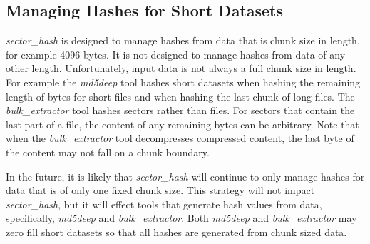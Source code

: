 \documentclass[10pt,twoside]{article}
\newcommand{\sh}{\emph{sector\_hash}\xspace}
\newcommand{\bulk}{\emph{bulk\_extractor}\xspace}
\newcommand{\mdd}{\emph{md5deep}\xspace}
\begin{document}
\subsection{Managing Hashes for Short Datasets}
\sh is designed to manage hashes from data that is chunk size in length,
for example 4096 bytes.
It is not designed to manage hashes from data of any other length.
Unfortunately, input data is not always a full chunk size in length.
For example the \mdd tool hashes short datasets when hashing
the remaining length of bytes for short files
and when hashing the last chunk of long files.
The \bulk tool hashes sectors rather than files.
For sectors that contain the last part of a file,
the content of any remaining bytes can be arbitrary.
Note that when the \bulk tool decompresses compressed content,
the last byte of the content may not fall on a chunk boundary.

In the future, it is likely that \sh will continue to only manage
hashes for data that is of only one fixed chunk size.
This strategy will not impact \sh,
but it will effect tools that generate hash values from data,
specifically, \mdd and \bulk.
Both \mdd and \bulk may zero fill short datasets so that all
hashes are generated from chunk sized data.



\end{document}
